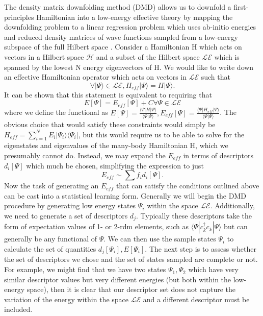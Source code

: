 \documentclass{article}
\begin{document}
The density matrix downfolding method (DMD) allows us to downfold a first-principles Hamiltonian into a low-energy effective theory by mapping the downfolding problem to a linear regression problem which uses ab-initio energies and reduced density matrices of wave functions sampled from a low-energy subspace of the full Hilbert space \cite{10.3389/fphy.2018.00043}. 
Consider a Hamiltonian H which acts on vectors in a Hilbert space $\mathcal{H}$ and a subset of the Hilbert space $\mathcal{LE}$ which is spanned by the lowest N energy eigenvectors of H. 
We would like to write down an effective Hamiltonian operator which acts on vectors in $\mathcal{LE}$ such that  $$\forall |\Psi\rangle \in \mathcal{LE}, H_{eff}|\Psi \rangle = H|\Psi \rangle.$$ 
It can be shown that this statement is equivalent to requiring that $$ E[\Psi] = E_{eff}[\Psi] + C \forall \Psi \in \mathcal{LE}$$ where we define the functional as $E[\Psi] = \frac{\langle \Psi | H | \Psi \rangle}{\langle \Psi | \Psi \rangle},E_{eff}[\Psi] = \frac{\langle \Psi | H_{eff} | \Psi \rangle}{\langle \Psi | \Psi \rangle}$. 
The obvious choice that would satisfy these constraints would simply be $H_{eff} = \sum_{i=1}^{N} E_i |\Psi_i\rangle \langle \Psi_i|$, but this would require us to be able to solve for the eigenstates and eigenvalues of the many-body Hamiltonian H, which we presumably cannot do. 
Instead, we may expand the $E_{eff}$ in terms of descriptors $d_i[\Psi]$ which much be chosen, simplifying the expression to just 
\begin{equation}
E_{eff} \sim \sum f_i d_i[\Psi].
\end{equation}
Now the task of generating an $E_{eff}$ that can satisfy the conditions outlined above can be cast into a statistical learning form.
Generally we will begin the DMD procedure by generating low energy states $\Psi_i$ within the space $\mathcal{LE}$. 
Additionally, we need to generate a set of descriptors $d_j$. 
Typically these descriptors take the form of expectation values of 1- or 2-rdm elements, such as $\langle \Psi| c^\dagger_k c_k |\Psi \rangle$ but can generally be any functional of $\Psi$. 
We can then use the sample states $\Psi_i$ to calculate the set of quantities $d_j[\Psi_i], E[\Psi_i]$. 
The next step is to assess whether the set of descriptors we chose and the set of states sampled are complete or not. 
For example, we might find that we have two states $\Psi_1, \Psi_2$ which have very similar descriptor values but very different energies (but both within the low-energy space), then it is clear that our descriptor set does not capture the variation of the energy within the space $\mathcal{LE}$ and a different descriptor must be included. 
\end{document}
